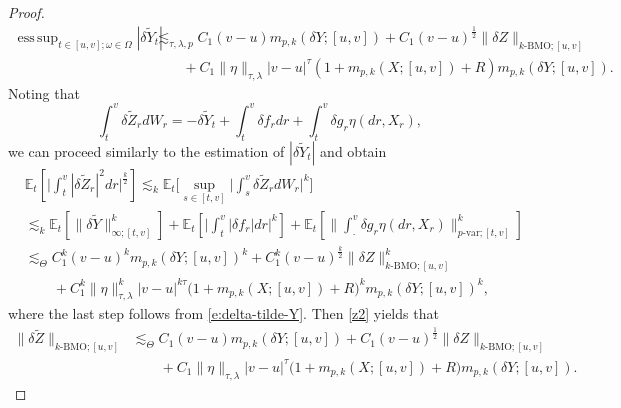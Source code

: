 \documentclass[11pt,reqno]{amsart}
\DeclareMathOperator*{\esssup}{ess\,sup}
\numberwithin{equation}{section}
\begin{document}
\begin{proof}
\begin{equation}\label{e:delta-tilde-Y}		
\begin{aligned}
\esssup_{t\in[u,v];\omega\in\Omega}|\delta \tilde{Y}_{t}|&\lesssim_{\tau,\lambda,p} C_{1}(v-u)m_{p,k}(\delta Y;[u,v]) + C_{1}(v-u)^{\frac{1}{2}}\|\delta Z\|_{k\text{-BMO};[u,v]} \\
&\quad\quad + C_{1}\|\eta\|_{\tau,\lambda}|v-u|^{\tau}(1+m_{p,k}(X;[u,v])+R)m_{p,k}(\delta Y;[u,v]).
\end{aligned}
\end{equation}
Noting that
\begin{equation}\label{e:equality delta tilde Z}
\int_{t}^{v}\delta \tilde{Z}_{r}dW_{r} = - \delta\tilde{Y}_{t} + \int_{t}^{v}\delta f_{r} dr + \int_{t}^{v} \delta g_{r}\eta(dr,X_{r}),
\end{equation} 
we can proceed similarly to the estimation of $|\delta \tilde Y_t |$ and obtain
\begin{equation}
\begin{aligned}
&\mathbb{E}_{t}\left[\Big|\int_{t}^{v}|\delta\tilde{Z}_{r}|^{2}dr\Big|^{\frac{k}{2}}\right] \lesssim_{k} \mathbb{E}_{t}\bigg[\sup_{s\in[t,v]}\Big|\int_{s}^{v}\delta\tilde{Z}_{r}dW_{r}\Big|^{k}\bigg]\\ 
&\lesssim_{k} \mathbb{E}_{t}\left[\|\delta\tilde{Y}\|^{k}_{\infty;[t,v]}\right] + \mathbb{E}_{t}\left[\Big|\int_{t}^{v}|\delta f_{r}|dr\Big|^{k}\right] + \mathbb{E}_{t}\left[\Big\|\int_{\cdot}^{v}\delta g_{r}\eta(dr,X_{r})\Big\|^{k}_{p\text{-var};[t,v]}\right]\\  \label{z2}
&\lesssim_{\Theta} C_{1}^{k}(v-u)^{k}m_{p,k}(\delta Y;[u,v])^{k} + C_{1}^{k}(v-u)^{\frac{k}{2}}\|\delta Z\|^{k}_{k\text{-BMO};[u,v]} \\ 
&\quad\quad + C_{1}^{k}\|\eta\|^{k}_{\tau,\lambda}|v-u|^{k\tau}\big(1+m_{p,k}(X;[u,v])+R\big)^{k}m_{p,k}(\delta Y;[u,v])^{k},
\end{aligned}
\end{equation}
where the last step follows from \eqref{e:delta-tilde-Y}. Then \eqref{z2} yields that	
\begin{equation}\label{e:estimate-theorem2-Z}
\begin{aligned}
\|\delta \tilde{Z}\|_{k\text{-BMO};[u,v]}&\lesssim_{\Theta} C_{1}(v-u)m_{p,k}(\delta Y;[u,v]) + C_{1}(v-u)^{\frac{1}{2}}\|\delta Z\|_{k\text{-BMO};[u,v]} \\
&\quad\quad + C_{1}\|\eta\|_{\tau,\lambda}|v-u|^{\tau}\big(1+m_{p,k}(X;[u,v])+R\big)m_{p,k}(\delta Y;[u,v]).
\end{aligned}

\end{equation}
\end{proof}
\end{document}
